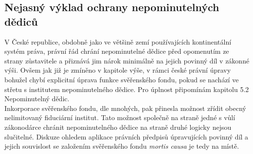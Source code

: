 \documentclass{article}
\begin{document}

\subsection{Nejasný výklad ochrany nepominutelných dědiců}



V České republice, obdobně jako ve většině zemí používajících kontinentální systém práva, právní řád chrání nepominutelné dědice před opomenutím ze strany zůstavitele a přiznává jim nárok minimálně na jejich povinný díl v zákonné výši. Ovšem jak již je zmíněno v kapitole výše, v rámci české právní úpravy bohužel chybí explicitní úprava funkce svěřenského fondu, pokud se nachází ve střetu s institutem nepominutelného dědice. Pro úplnost připomínám kapitolu 5.2 Nepominutelný dědic.\\

Inkorporace svěřenského fondu, dle mnohých, pak přinesla možnost zřídit obecný nelimitovaný fiduciární institut. Tato možnost společně na straně jedné s vůlí zákonodárce chránit nepominutelného dědice na straně druhé logicky nejsou slučitelné. Diskuze ohledem aplikace právních předpisů úpravujících povinný díl a jejich souvislost se založením svěřenského fondu \textit{mortis causa} je tedy na místě.\\
\end{document}
